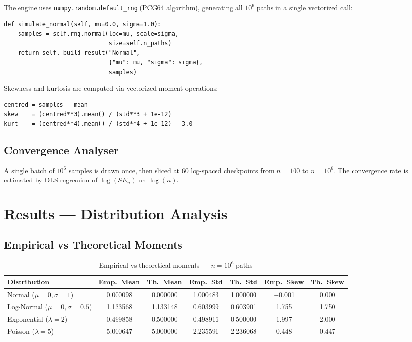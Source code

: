 \documentclass[12pt,a4paper]{article}
\begin{document}
The engine uses \texttt{numpy.random.default\_rng} (PCG64 algorithm), generating all $10^6$
paths in a single vectorized call:

\begin{lstlisting}[caption={Vectorized Normal sampler}]
def simulate_normal(self, mu=0.0, sigma=1.0):
    samples = self.rng.normal(loc=mu, scale=sigma,
                              size=self.n_paths)
    return self._build_result("Normal",
                              {"mu": mu, "sigma": sigma},
                              samples)
\end{lstlisting}

Skewness and kurtosis are computed via vectorized moment operations:
\begin{lstlisting}[caption={Vectorized moment computation}]
centred = samples - mean
skew    = (centred**3).mean() / (std**3 + 1e-12)
kurt    = (centred**4).mean() / (std**4 + 1e-12) - 3.0
\end{lstlisting}

\subsection{Convergence Analyser}

A single batch of $10^6$ samples is drawn once, then sliced at 60 log-spaced checkpoints
from $n=100$ to $n=10^6$. The convergence rate is estimated by OLS regression of
$\log(SE_n)$ on $\log(n)$.

\section{Results --- Distribution Analysis}

\subsection{Empirical vs Theoretical Moments}

\begin{table}[H]
\centering
\caption{Empirical vs theoretical moments --- $n=10^6$ paths}
\renewcommand{\arraystretch}{1.3}
\begin{tabular}{lcccccc}
\toprule
\textbf{Distribution} & \textbf{Emp.\ Mean} & \textbf{Th.\ Mean}
  & \textbf{Emp.\ Std} & \textbf{Th.\ Std}
  & \textbf{Emp.\ Skew} & \textbf{Th.\ Skew}\\
\midrule
Normal ($\mu{=}0,\sigma{=}1$)         & 0.000098 & 0.000000 & 1.000483 & 1.000000 & $-$0.001 & 0.000\\
Log-Normal ($\mu{=}0,\sigma{=}0.5$)   & 1.133568 & 1.133148 & 0.603999 & 0.603901 & 1.755 & 1.750\\
Exponential ($\lambda{=}2$)           & 0.499858 & 0.500000 & 0.498916 & 0.500000 & 1.997 & 2.000\\
Poisson ($\lambda{=}5$)               & 5.000647 & 5.000000 & 2.235591 & 2.236068 & 0.448 & 0.447\\
\bottomrule
\end{tabular}
\end{table}
\end{document}
